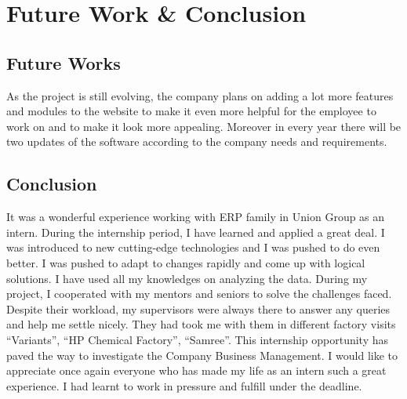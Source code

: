 \chapter{Future Work \& Conclusion}

\section{Future Works}

As the project is still evolving, the company plans on adding a lot more features and modules to the website to make it even more helpful for the employee to work on and to make it look more appealing. Moreover in every year there will be two updates of the software according to the company needs and requirements.

\section{Conclusion}

It was a wonderful experience working with ERP family in Union Group as an intern. During the internship period, I have learned and applied a great deal. I was introduced to new cutting-edge technologies and I was pushed to do even better. I was pushed to adapt to changes rapidly and come up with logical solutions. I have used all my knowledges on analyzing the data. During my project, I cooperated with my mentors and seniors to solve the challenges faced. Despite their workload, my supervisors were always there to answer any queries and help me settle nicely. They had took me with them in different factory visits “Variants”, “HP Chemical Factory”, “Samree”. This internship opportunity has paved the way to investigate the Company Business Management. I would like to appreciate once again everyone who has made my life as an intern such a great experience. I had learnt to work in pressure and fulfill under the deadline. 